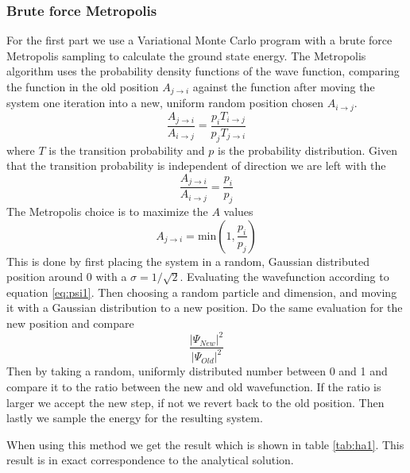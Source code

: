 \documentclass[12pt]{article}
\begin{document}
  \subsubsection{Brute force Metropolis}
  For the first part we use a Variational Monte Carlo program with a brute force Metropolis
  sampling to calculate the ground state energy. The Metropolis algorithm uses the 
  probability density functions of the wave function, comparing the function in the old  
  position $A_{j\rightarrow i}$ against the function after moving the system one iteration
  into a new, uniform random position chosen  $A_{i\rightarrow j}$.
  \begin{equation}
    \frac{A_{j\rightarrow i}}{A_{i\rightarrow j}} = %
    \frac{p_i T_{i\rightarrow j}}{p_j T_{j\rightarrow i}}
  \end{equation}
  where $T$ is the transition probability and $p$ is the probability distribution.
  Given that the transition probability is independent of direction we are left with the
  \begin{equation}
    \frac{A_{j\rightarrow i}}{A_{i\rightarrow j}} = %
    \frac{p_i}{p_j}
  \end{equation}
  The Metropolis choice is to maximize the $A$ values
  \begin{equation}
    A_{j\rightarrow i} = \text{min}\left(1,\frac{p_i}{p_j}\right)
  \end{equation}
  This is done by first placing the system in a random, Gaussian distributed position 
  around 0 with a $\sigma = 1/\sqrt{2}$. Evaluating the wavefunction according to 
  equation \ref{eq:psi1}. Then choosing a random particle and dimension, and moving 
  it with a Gaussian distribution to a new position. Do the same evaluation for the 
  new position and compare
  \[\frac{|\Psi_{New}|^2}{|\Psi_{Old}|^2}\]
  Then by taking a random, uniformly distributed number between 0 and 1 and compare it
  to the ratio between the new and old wavefunction. If the ratio is larger we accept
  the new step, if not we revert back to the old position. Then lastly we sample the energy for
  the resulting system.
  
  When using this method we get the result which is shown in table \ref{tab:ha1}. This result is
  in exact correspondence to the analytical solution.
\end{document}
